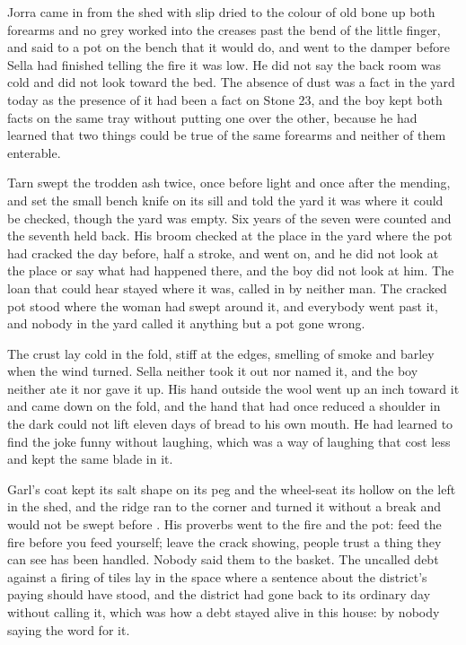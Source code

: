Jorra came in from the shed with slip dried to the colour of old bone up both forearms and no grey worked into the creases past the bend of the little finger, and said to a pot on the bench that it would do, and went to the damper before Sella had finished telling the fire it was low. He did not say the back room was cold and did not look toward the bed. The absence of dust was a fact in the yard today as the presence of it had been a fact on Stone 23, and the boy kept both facts on the same tray without putting one over the other, because he had learned that two things could be true of the same forearms and neither of them enterable.

Tarn swept the trodden ash twice, once before light and once after the mending, and set the small bench knife on its sill and told the yard it was where it could be checked, though the yard was empty. Six years of the seven were counted and the seventh held back. His broom checked at the place in the yard where the pot had cracked the day before, half a stroke, and went on, and he did not look at the place or say what had happened there, and the boy did not look at him. The loan that could hear stayed where it was, called in by neither man. The cracked pot stood where the woman had swept around it, and everybody went past it, and nobody in the yard called it anything but a pot gone wrong.

The crust lay cold in the fold, stiff at the edges, smelling of smoke and barley when the wind turned. Sella neither took it out nor named it, and the boy neither ate it nor gave it up. His hand outside the wool went up an inch toward it and came down on the fold, and the hand that had once reduced a shoulder in the dark could not lift eleven days of bread to his own mouth. He had learned to find the joke funny without laughing, which was a way of laughing that cost less and kept the same blade in it.

Garl's coat kept its salt shape on its peg and the wheel-seat its hollow on the left in the shed, and the ridge ran to the corner and turned it without a break and would not be swept before . His proverbs went to the fire and the pot: feed the fire before you feed yourself; leave the crack showing, people trust a thing they can see has been handled. Nobody said them to the basket. The uncalled debt against a firing of tiles lay in the space where a sentence about the district's paying should have stood, and the district had gone back to its ordinary day without calling it, which was how a debt stayed alive in this house: by nobody saying the word for it.

